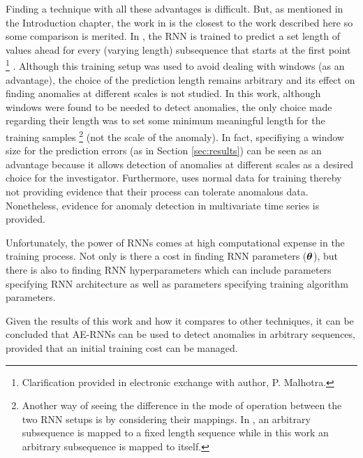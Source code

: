 Finding a technique with all these advantages is difficult.
%
But, as mentioned in the Introduction chapter, the work in \cite{Malhotra2015} is the closest to the work described here so some comparison is merited.
%
In \cite{Malhotra2015}, the RNN is trained to predict a set length of values ahead for every (varying length) subsequence that starts at the first point%
\footnote{Clarification provided in electronic exchange with author, P. Malhotra.}%
.
%
Although this training setup was used to avoid dealing with windows (as an advantage), the choice of the prediction length remains arbitrary and its effect on finding anomalies at different scales is not studied.
%
In this work, although windows were found to be needed to detect anomalies, the only choice made regarding their length was to set some minimum meaningful length for the training samples%
\footnote{Another way of seeing the difference in the mode of operation between the two RNN setups is by considering their mappings. In \cite{Malhotra2015}, an arbitrary subsequence is mapped to a fixed length sequence while in this work an arbitrary subsequence is mapped to itself.}
(not the scale of the anomaly).
%
In fact, specifiying a window size for the prediction errors (as in Section \ref{sec:results}) can be seen as an advantage because it allows detection of anomalies at different scales as a desired choice for the investigator.
%
Furthermore, \cite{Malhotra2015} uses normal data for training thereby not providing evidence that their process can tolerate anomalous data.
%
Nonetheless, evidence for anomaly detection in multivariate time series is provided.

Unfortunately, the power of RNNs comes at high computational expense in the training process.
%
Not only is there a cost in finding RNN parameters ($\boldsymbol{\theta}$), but there is also to finding RNN hyperparameters which can include parameters specifying RNN architecture as well as parameters specifying training algorithm parameters.


Given the results of this work and how it compares to other techniques, it can be concluded that AE-RNNs can be used to detect anomalies in arbitrary sequences, provided that an initial training cost can be managed.


